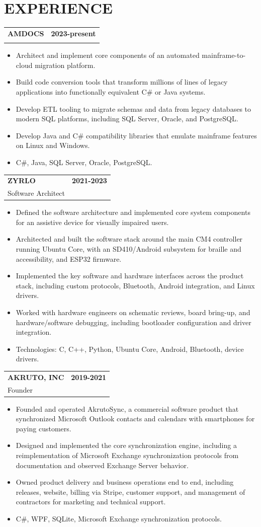\documentclass[11pt]{article}
\makeatletter
\newcommand{\IFELSE}[3]{\iftoggle{#1}{#2}{#3}}
\newcommand{\resheader}[1]{\section*{#1}\vspace{-4pt}}
\newcommand{\jobheading}[4]{%
  \vspace{6pt}\begin{tabularx}{\textwidth}{@{}X r@{}}
    {\textbf{#1}} & {\textbf{#2}} \\
    {{\normalsize #3}\hspace{0.5em}{\color{muted}·}\hspace{0.5em}{\color{muted}#4}} & {} \\
  \end{tabularx}\vspace{2pt}
}
\makeatother
\begin{document}
\resheader{EXPERIENCE}

\jobheading{AMDOCS}{2023-present}{\IFELSE{MF}{Mainframe Modernization Engineer}{Cloud Migration Engineer, Platform \& Tooling}}{Remote}
\begin{itemize}
\item Architect and implement core components of an automated mainframe-to-cloud migration platform.
\item Build code conversion tools that transform millions of lines of legacy applications into functionally equivalent C\# or Java systems.
\item Develop ETL tooling to migrate schemas and data from legacy databases to modern SQL platforms, including SQL Server, Oracle, and PostgreSQL.
\item Develop Java and C\# compatibility libraries that emulate mainframe features on Linux and Windows.
\item C\#, Java, SQL Server, Oracle, PostgreSQL.
\end{itemize}

\jobheading{ZYRLO}{2021-2023}{Software Architect}{Sudbury, MA}
\begin{itemize}
\item Defined the software architecture and implemented core system components for an assistive device for visually impaired users.
\item Architected and built the software stack around the main CM4 controller running Ubuntu Core, with an SD410/Android subsystem for braille and accessibility, and ESP32 firmware.
\item Implemented the key software and hardware interfaces across the product stack, including custom protocols, Bluetooth, Android integration, and Linux drivers.
\item Worked with hardware engineers on schematic reviews, board bring-up, and hardware/software debugging, including bootloader configuration and driver integration.
\item Technologies: C, C++, Python, Ubuntu Core, Android, Bluetooth, device drivers.
\end{itemize}

\jobheading{AKRUTO, INC}{2019-2021}{Founder}{Needham, MA}
\begin{itemize}
\item Founded and operated AkrutoSync, a commercial software product that synchronized Microsoft Outlook contacts and calendars with smartphones for paying customers.
\item Designed and implemented the core synchronization engine, including a reimplementation of Microsoft Exchange synchronization protocols from documentation and observed Exchange Server behavior.
\item Owned product delivery and business operations end to end, including releases, website, billing via Stripe, customer support, and management of contractors for marketing and technical support.
\item C\#, WPF, SQLite, Microsoft Exchange synchronization protocols.
\end{itemize}
\end{document}

